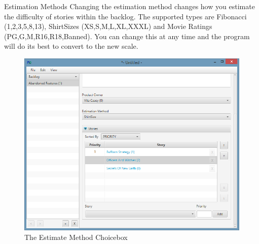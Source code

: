 \newline
Estimation Methods
\newline
Changing the estimation method changes how you estimate the difficulty of stories within the backlog. The supported types are Fibonacci (1,2,3,5,8,13), ShirtSizes (XS,S,M,L,XL,XXXL) and Movie Ratings (PG,G,M,R16,R18,Banned). You can change this at any time and the program will do its best to convert to the new scale.

\begin{figure}[H]
\centering
\includegraphics[width=\textwidth]{images/screenshots/backlogs.PNG}
\caption{The Estimate Method Choicebox}
\label{fig:new_project}
\end{figure}